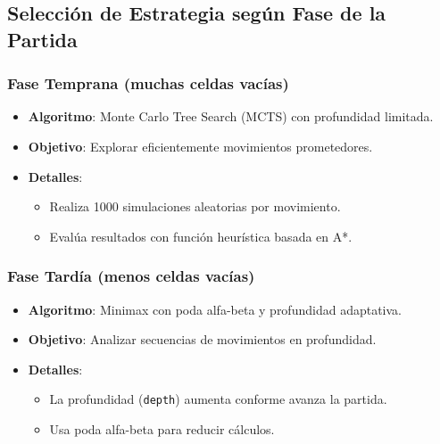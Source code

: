 \documentclass{article}
\begin{document}
\subsection{Selección de Estrategia según Fase de la Partida}

\subsubsection{Fase Temprana (muchas celdas vacías)}
\begin{itemize}
\item \textbf{Algoritmo}: Monte Carlo Tree Search (MCTS) con profundidad limitada.
\item \textbf{Objetivo}: Explorar eficientemente movimientos prometedores.
\item \textbf{Detalles}:
\begin{itemize}
\item Realiza 1000 simulaciones aleatorias por movimiento.
\item Evalúa resultados con función heurística basada en A*.
\end{itemize}
\end{itemize}

\subsubsection{Fase Tardía (menos celdas vacías)}
\begin{itemize}
\item \textbf{Algoritmo}: Minimax con poda alfa-beta y profundidad adaptativa.
\item \textbf{Objetivo}: Analizar secuencias de movimientos en profundidad.
\item \textbf{Detalles}:
\begin{itemize}
\item La profundidad (\texttt{depth}) aumenta conforme avanza la partida.
\item Usa poda alfa-beta para reducir cálculos.
\end{itemize}
\end{itemize}
\end{document}
